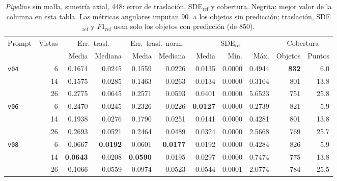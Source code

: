 \begin{table}[htbp]
\centering
\caption{\textit{Pipeline} sin malla, simetría axial, 448: error de traslación, SDE$_{\mathrm{ref}}$ y cobertura. Negrita: mejor valor de la columna en esta tabla. Las métricas angulares imputan $90^\circ$ a los objetos sin predicción; traslación, SDE$_{\mathrm{ref}}$ y $F1_{\mathrm{ref}}$ usan solo los objetos con predicción (de 850).}
\label{tab:axis_448_posicion}
\begin{adjustbox}{max width=\textwidth}
\begin{tabular}{lrrrrrrrrrr}
\toprule
\multirow{2}{*}{Prompt} & \multirow{2}{*}{Vistas} & \multicolumn{2}{c}{Err.\ trasl.} & \multicolumn{2}{c}{Err.\ trasl.\ norm.} & \multicolumn{3}{c}{SDE$_{\mathrm{ref}}$} & \multicolumn{2}{c}{Cobertura} \\
\cmidrule(lr){3-4} \cmidrule(lr){5-6} \cmidrule(lr){7-9} \cmidrule(lr){10-11}
 &  & Media & Mediana & Media & Mediana & Media & Mín. & Máx. & Objetos & Puntos \\
\midrule
\multirow{3}{*}{\texttt{v04}} & 6 & 0.1674 & 0.0245 & 0.1559 & 0.0226 & 0.0135 & 0.0000 & 0.4944 & \textbf{832} & 6.0 \\
 & 14 & 0.1575 & 0.0285 & 0.1463 & 0.0263 & 0.0134 & 0.0000 & 0.3104 & 801 & 13.8 \\
 & 26 & 0.2775 & 0.0645 & 0.2571 & 0.0593 & 0.0401 & 0.0000 & 5.6523 & 751 & 25.8 \\
\midrule
\multirow{3}{*}{\texttt{v06}} & 6 & 0.2470 & 0.0245 & 0.2326 & 0.0226 & \textbf{0.0127} & 0.0000 & 0.2739 & 821 & 5.9 \\
 & 14 & 0.1938 & 0.0276 & 0.1790 & 0.0251 & 0.0141 & 0.0000 & 0.4281 & 801 & 13.8 \\
 & 26 & 0.2693 & 0.0521 & 0.2464 & 0.0489 & 0.0324 & 0.0000 & 2.5668 & 769 & 25.7 \\
\midrule
\multirow{3}{*}{\texttt{v08}} & 6 & 0.0667 & \textbf{0.0192} & 0.0601 & \textbf{0.0177} & 0.0192 & 0.0000 & 0.4284 & 826 & 5.9 \\
 & 14 & \textbf{0.0643} & 0.0208 & \textbf{0.0590} & 0.0195 & 0.0297 & 0.0000 & 0.7474 & 775 & 13.8 \\
 & 26 & 0.1066 & 0.0559 & 0.0974 & 0.0523 & 0.0544 & 0.0001 & 2.0774 & 784 & 25.5 \\
\bottomrule
\end{tabular}
\end{adjustbox}
\end{table}
